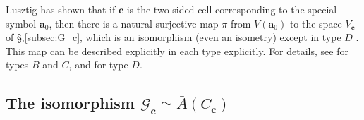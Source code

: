 \documentclass{amsart}
\theoremstyle{definition}
\DeclareMathOperator{\Irr}{Irr}
\newcommand{\cG}{\mathcal{G}}
\newcommand{\ba}{\mathbf{a}}
\newcommand{\bc}{{\mathbf{c}}}
\newcommand{\Ab}{\bar{A}}
\newcommand{\0}{\mathcal{O}}
\begin{document}
Lusztig has shown that if $\bc$ is the two-sided cell corresponding to
the special symbol $\ba_0$, then there is a natural surjective map
$\pi$ from $V(\ba_0)$ to the space $V_\bc$ of \S,\ref{subsec:G_c}, which is an isomorphism (even an isometry) except in type
$D$ \cite{Lusztig1984}. This map can be described explicitly in each type explicitly. For details,
see \cite[pp.~86--88]{Lusztig1984} for types $B$ and $C$, and \cite[pp.~92--94]{Lusztig1984} for type $D$.

\subsection{The isomorphism $\cG_\bc \simeq \Ab(C_\bc)$}
\end{document}
